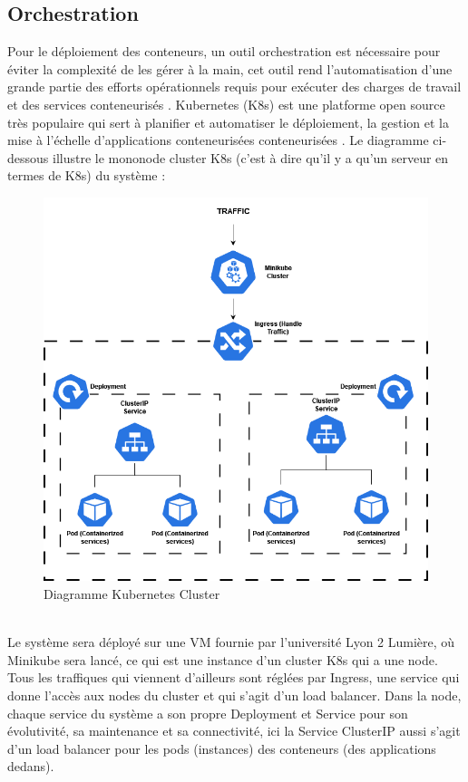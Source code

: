 \documentclass{template}
\begin{document}
\subsection{Orchestration}
Pour le déploiement des conteneurs, un outil orchestration est nécessaire pour éviter la complexité de les gérer à la main, cet outil rend l'automatisation d'une grande partie des efforts opérationnels requis pour exécuter des charges de travail et des services conteneurisés \cite{ibmBenefitsKubernetes}. Kubernetes (K8s) est une platforme open source très populaire qui sert à planifier et automatiser le déploiement, la gestion et la mise à l'échelle d'applications conteneurisées conteneurisées \cite{VMWare_2022}. Le diagramme ci-dessous illustre le mononode cluster K8s (c'est à dire qu'il y a qu'un serveur en termes de K8s) du système : 
\begin{figure}[h!]
    \includegraphics[scale=0.4]{Pics/K8s Diagram.png}
    \centering
    \caption{Diagramme Kubernetes Cluster}
\end{figure}
\\
Le système sera déployé sur une VM fournie par l'université Lyon 2 Lumière, où Minikube sera lancé, ce qui est une instance d'un cluster K8s qui a une node. Tous les traffiques qui viennent d'ailleurs sont réglées par Ingress, une service qui donne l'accès aux nodes du cluster et qui s'agit d'un load balancer. Dans la node, chaque service du système a son propre Deployment et Service pour son évolutivité, sa maintenance et sa connectivité, ici la Service ClusterIP aussi s'agit d'un load balancer pour les pods (instances) des conteneurs (des applications dedans).
\end{document}
